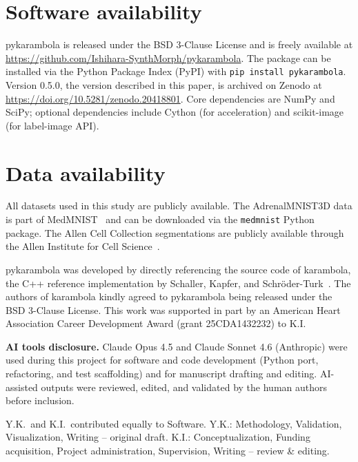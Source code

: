 \documentclass[times, twoside, watermark]{zHenriquesLab-StyleBioRxiv}
\begin{document}
\section*{Software availability}
pykarambola is released under the BSD 3-Clause License and is freely available at \url{https://github.com/Ishihara-SynthMorph/pykarambola}.
The package can be installed via the Python Package Index (PyPI) with \texttt{pip install pykarambola}.
Version 0.5.0, the version described in this paper, is archived on Zenodo at \url{https://doi.org/10.5281/zenodo.20418801}.
Core dependencies are NumPy and SciPy; optional dependencies include Cython (for acceleration) and scikit-image (for label-image API).

\section*{Data availability}
All datasets used in this study are publicly available.
The AdrenalMNIST3D data is part of MedMNIST~\cite{Yang2023MedMNIST} and can be downloaded via the \texttt{medmnist} Python package.
The Allen Cell Collection segmentations are publicly available through the Allen Institute for Cell Science~\cite{viana2023integrated}.


\begin{acknowledgements}
pykarambola was developed by directly referencing the source code of karambola, the C++ reference implementation by Schaller, Kapfer, and Schröder-Turk~\cite{Schaller2020karambola}.
The authors of karambola kindly agreed to pykarambola being released under the BSD 3-Clause License.
This work was supported in part by an American Heart Association Career Development Award (grant 25CDA1432232) to K.I.

\textbf{AI tools disclosure.}
Claude Opus 4.5 and Claude Sonnet 4.6 (Anthropic) were used during this project for software and code development (Python port, refactoring, and test scaffolding) and for manuscript drafting and editing.
AI-assisted outputs were reviewed, edited, and validated by the human authors before inclusion.
\end{acknowledgements}

\begin{contributions}
Y.K.\ and K.I.\ contributed equally to Software.
Y.K.: Methodology, Validation, Visualization, Writing -- original draft.
K.I.: Conceptualization, Funding acquisition, Project administration, Supervision, Writing -- review \& editing.
\end{contributions}
\end{document}
